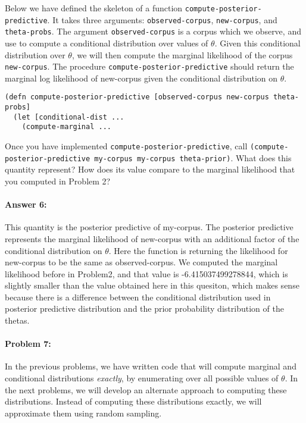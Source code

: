 \documentclass[10pt]{article}
\begin{document}
\noindent Below we have defined the skeleton of a function
\texttt{compute-posterior-predictive}. It takes three arguments:
\texttt{observed-corpus}, \texttt{new-corpus}, and
\texttt{theta-probs}. The argument \texttt{observed-corpus} is a corpus which we
observe, and use to compute a conditional distribution over values of
$\theta$. Given this conditional distribution over $\theta$, we will
then compute the marginal likelihood of the corpus
\texttt{new-corpus}. The procedure
\texttt{compute-posterior-predictive} should return the marginal
log likelihood of new-corpus given the conditional distribution on
$\theta$.

\begin{lstlisting}
(defn compute-posterior-predictive [observed-corpus new-corpus theta-probs]
  (let [conditional-dist ...
    (compute-marginal ...
\end{lstlisting}

\noindent Once you have implemented
\texttt{compute-posterior-predictive}, call
\texttt{(compute-posterior-predictive my-corpus my-corpus
  theta-prior)}. What does this quantity represent? How does its value
compare to the marginal likelihood that you computed in Problem 2?

\paragraph{Answer 6:} This quantity is the posterior predictive of my-corpus. The posterior predictive represents the marginal likelihood of new-corpus with an additional factor of the conditional distribution on $\theta$. Here the function is returning the likelihood for new-corpus to be the same as observed-corpus. We computed the marginal likelihood before in Problem2, and that value is -6.415037499278844, which is slightly smaller than the value obtained here in this quesiton, which makes sense because there is a difference between the conditional distribution used in posterior predictive distribution and the prior probability distribution of the thetas.     

\noindent\hrulefill %

\paragraph{Problem 7:} 

In the previous problems, we have written code that will compute
marginal and conditional distributions \emph{exactly}, by enumerating
over all possible values of $\theta$. In the next problems, we will
develop an alternate approach to computing these
distributions. Instead of computing these distributions exactly, we
will approximate them using random sampling.
\\
\end{document}
